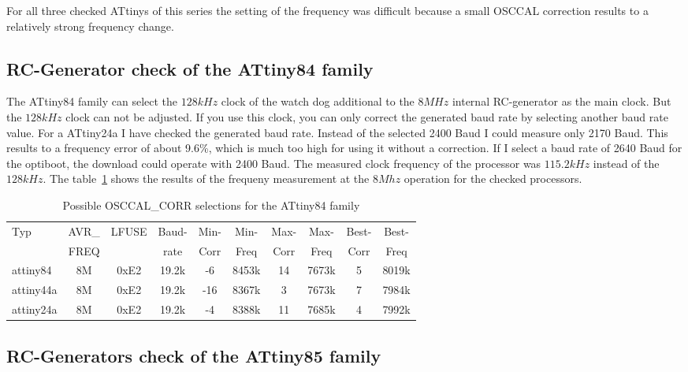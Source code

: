 For all three checked ATtinys of this series the setting of the frequency was difficult
because a small OSCCAL correction results to a relatively strong frequency change.


\subsection{RC-Generator check of the ATtiny84 family}

The ATtiny84 family can select the \(128kHz\) clock of the watch dog additional
to the \(8MHz\) internal RC-generator as the main clock.
But the \(128kHz\) clock can not be adjusted. If you use this clock,
you can only correct the generated baud rate by selecting another baud rate value.
For a ATtiny24a I have checked the generated baud rate. Instead of the selected
2400 Baud I could measure only 2170 Baud.
This results to a frequency error of about 9.6\%, which is much too high for
using it without a correction.
If I select a baud rate of 2640 Baud for the optiboot, the download could operate with 
2400 Baud. The measured clock frequency of the processor was \(115.2kHz\) instead
of the \(128kHz\).
The table~\ref{tab:tiny84freq} shows the results of the frequeny measurement
at the \(8Mhz\) operation for the checked processors.

\begin{table}[H]
  \begin{center}
    \begin{tabular}{| l | c | c | c || c | c || c | c || c | c |}
    \hline
   Typ  &       AVR\_ & LFUSE & Baud- & Min- & Min- & Max- & Max- & Best- & Best-  \\
        &       FREQ  &       & rate & Corr & Freq & Corr & Freq  & Corr  & Freq  \\
    \hline
    \hline
attiny84 &          8M & 0xE2  & 19.2k &  -6  & 8453k & 14  & 7673k  & 5  & 8019k \\
    \hline
attiny44a &         8M & 0xE2  & 19.2k &  -16  & 8367k & 3  & 7673k  & 7  & 7984k \\
    \hline
attiny24a &         8M & 0xE2  & 19.2k &  -4  & 8388k & 11  & 7685k  & 4  & 7992k \\
    \hline
    \end{tabular}
  \end{center}
  \caption{Possible OSCCAL\_CORR selections for the ATtiny84 family}
  \label{tab:tiny84freq}
\end{table}

\subsection{RC-Generators check of the ATtiny85 family}

